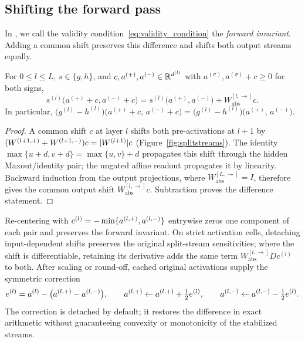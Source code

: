 \subsection{Shifting the forward pass}\label{subsec:forward_stabilization}

In \textcite{hiddenMono}, we call the validity condition~\eqref{eq:validity_condition} the \emph{forward invariant}. Adding a common shift preserves this difference and shifts both output streams equally.

\begin{theoremenv}\label{thm:shift_forward}
For $0\le l\le L$, $s\in\{g,h\}$, and $c,a^{(+)},a^{(-)}\in\mathbb{R}^{d^{(l)}}$ with $a^{(\sigma)},a^{(\sigma)}+c\ge0$ for both signs,
\begin{equation}
s^{(l)}\bigl(a^{(+)}+c,a^{(-)}+c\bigr)
=s^{(l)}\bigl(a^{(+)},a^{(-)}\bigr)+W_{\mathrm{abs}}^{[l,\rightarrow]}c.
\label{eq:shift_forward}
\end{equation}
In particular, $\bigl(g^{(l)} - h^{(l)}\bigr)\bigl( a^{(+)} + c,\, a^{(-)} + c \bigr) = \bigl(g^{(l)} - h^{(l)}\bigr)\bigl( a^{(+)},\, a^{(-)} \bigr)$.\end{theoremenv}

\begin{proof}
A common shift $c$ at layer $l$ shifts both pre-activations at $l+1$ by $(W^{(l+1,+)}+W^{(l+1,-)})c=|W^{(l+1)}|c$ (Figure~\ref{fig:splitstreams}). The identity $\max\{u+d,v+d\}=\max\{u,v\}+d$ propagates this shift through the hidden Maxout/identity pair; the ungated affine readout propagates it by linearity. Backward induction from the output projections, where $W_{\mathrm{abs}}^{[L,\rightarrow]}=I$, therefore gives the common output shift $W_{\mathrm{abs}}^{[l,\rightarrow]}c$. Subtraction proves the difference statement.
\end{proof}

Re-centering with $c^{(l)}=-\min\{a^{(l,+)},a^{(l,-)}\}$ entrywise zeros one component of each pair and preserves the forward invariant. On strict activation cells, detaching input-dependent shifts preserves the original split-stream sensitivities; where the shift is differentiable, retaining its derivative adds the same term $W_{\mathrm{abs}}^{[l,\rightarrow]}Dc^{(l)}$ to both. After scaling or round-off, cached original activations supply the symmetric correction
\[
    e^{(l)}=a^{(l)}-\bigl(a^{(l,+)}-a^{(l,-)}\bigr),
    \qquad
    a^{(l,+)}\leftarrow a^{(l,+)}+\tfrac12 e^{(l)},
    \qquad
    a^{(l,-)}\leftarrow a^{(l,-)}-\tfrac12 e^{(l)}.
\]
The correction is detached by default; it restores the difference in exact arithmetic without guaranteeing convexity or monotonicity of the stabilized streams.


